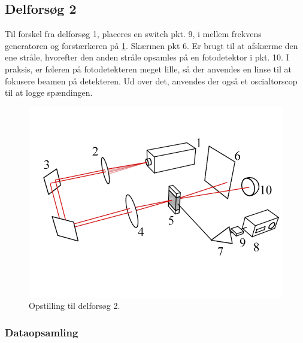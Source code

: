 \documentclass[main]{subfiles}
\begin{document}
\subsection{Delforsøg 2}
Til forskel fra delforsøg 1, placeres en switch pkt. 9, i mellem frekvens generatoren og forstærkeren på \cref{fig:opstilling2}. Skærmen pkt 6. Er brugt til at afskærme den ene stråle, hvorefter den anden stråle opsamles på en fotodetektor i pkt. 10. I praksis, er føleren på fotodetekteren meget lille, så der anvendes en linse til at fokusere beamen på detekteren. Ud over det, anvendes der også et oscialtorscop til at logge spændingen.
\begin{figure}[H]
    \centering
    \includegraphics[width=\linewidth]{tegninger/tegning2.png}
    \caption{Opstilling til delforsøg 2.}
    \label{fig:opstilling2}
\end{figure}

\subsubsection{Dataopsamling}
\end{document}
